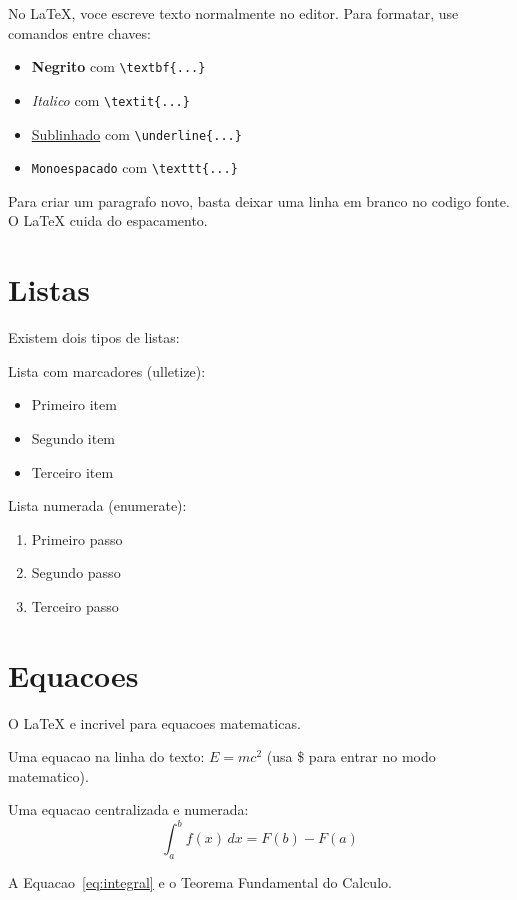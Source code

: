 No LaTeX, voce escreve texto normalmente no editor.
Para formatar, use comandos entre chaves:

\begin{itemize}
    \item \textbf{Negrito} com \verb|\textbf{...}|
    \item \textit{Italico} com \verb|\textit{...}|
    \item \underline{Sublinhado} com \verb|\underline{...}|
    \item \texttt{Monoespacado} com \verb|\texttt{...}|
\end{itemize}

Para criar um paragrafo novo, basta deixar uma linha em branco
no codigo fonte. O LaTeX cuida do espacamento.


\section{Listas}

Existem dois tipos de listas:

Lista com marcadores (ulletize):
\begin{itemize}
    \item Primeiro item
    \item Segundo item
    \item Terceiro item
\end{itemize}

Lista numerada (enumerate):
\begin{enumerate}
    \item Primeiro passo
    \item Segundo passo
    \item Terceiro passo
\end{enumerate}


\section{Equacoes}

O LaTeX e incrivel para equacoes matematicas.

Uma equacao na linha do texto: $E = mc^2$ (usa \$ para entrar no modo matematico).

Uma equacao centralizada e numerada:
\begin{equation}
    \int_{a}^{b} f(x) \, dx = F(b) - F(a)
    \label{eq:integral}
\end{equation}

A Equacao~\ref{eq:integral} e o Teorema Fundamental do Calculo.

